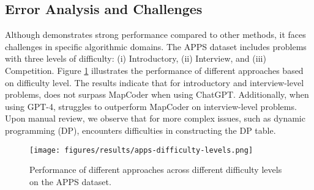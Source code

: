 \subsection{Error Analysis and Challenges}
\begin{nobreakwords}
Although \tool demonstrates strong performance compared to other methods, it faces challenges in specific algorithmic domains. The APPS dataset \cite{hendrycks2021apps} includes problems with three levels of difficulty: (i) Introductory, (ii) Interview, and (iii) Competition. Figure \ref{fig:difficulty-levels} illustrates the performance of different approaches based on difficulty level. The results indicate that for introductory and interview-level problems, \tool does not surpass MapCoder when using ChatGPT. Additionally, when using GPT-4, \tool struggles to outperform MapCoder on interview-level problems. Upon manual review, we observe that for more complex issues, such as dynamic programming (DP), \tool encounters difficulties in constructing the DP table.
\end{nobreakwords}


\begin{figure}[h]
    \centering
    \texttt{[image: figures/results/apps-difficulty-levels.png]}
    \vspace{-3mm}
    \caption{Performance of different approaches across different difficulty levels on the APPS dataset.}
    \label{fig:difficulty-levels}
    \vspace{-4mm}
\end{figure}  

